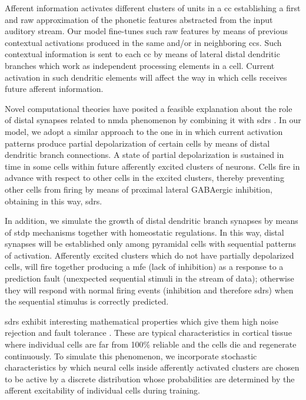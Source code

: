 \documentclass[11pt,a4paper]{article}
\begin{document}
Afferent information activates different clusters of units in a \gls{cc} establishing a first and raw approximation of the phonetic features abstracted from the input auditory stream. Our model fine-tunes such raw features by means of previous contextual activations produced in the same and/or in neighboring \glspl{cc}. Such contextual information is sent to each \gls{cc} by means of lateral distal dendritic branches which work as independent processing elements in a cell. Current activation in such dendritic elements will affect the way in which cells receives future afferent information.

Novel computational theories have posited a feasible explanation about the role of distal synapses related to \gls{nmda}
phenomenon \cite{hawkins_2016} by combining it with \glspl{sdr} \cite{ahmad_2016}. In our model, we adopt a similar approach to the one in \cite{hawkins_2016} in which current activation patterns produce partial depolarization of certain cells by means of distal dendritic branch connections. A state of partial depolarization is sustained in time in some cells within
future afferently excited clusters of neurons. Cells fire in advance with respect to other cells in the excited clusters, thereby preventing other cells from firing by means of proximal lateral GABAergic inhibition, obtaining in this way, \glspl{sdr}.

In addition, we simulate the growth of distal dendritic branch synapses by means of \gls{stdp} mechanisms together with
homeostatic regulations. In this way, distal synapses will be established only among pyramidal cells with sequential patterns
of activation. Afferently excited clusters which do not have partially depolarized cells,
will fire together producing a \gls{mfe}
(lack of inhibition) as a response to a prediction fault (unexpected sequential stimuli in the stream of data); otherwise they will respond with normal firing events (inhibition and therefore \glspl{sdr}) when the sequential stimulus is
correctly predicted.

\glspl{sdr} exhibit interesting mathematical properties which give them high noise rejection and fault tolerance \cite{ahmad_2015}.
These are typical characteristics in cortical tissue where individual cells are far from 100\% reliable and the cells die and regenerate continuously. To simulate this phenomenon, we incorporate stochastic characteristics by which neural cells inside afferently activated clusters are chosen to be active by a discrete distribution whose probabilities are determined by the afferent excitability of individual cells during training.
\end{document}
